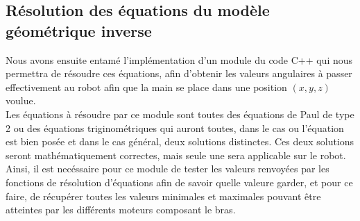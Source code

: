 \subsection{Résolution des équations du modèle géométrique inverse}

Nous avons ensuite entamé l'implémentation d'un module du code C++ qui nous permettra de résoudre ces équations, afin d'obtenir les valeurs angulaires à passer effectivement au robot afin que la main se place dans une position $(x, y, z)$ voulue.\\

Les équations à résoudre par ce module sont toutes des équations de Paul de type 2 ou des équations triginométriques qui auront toutes, dans le cas ou l'équation est bien posée et dans le cas général, deux solutions distinctes. Ces deux solutions seront mathématiquement correctes, mais seule une sera applicable sur le robot. Ainsi, il est necéssaire pour ce module de tester les valeurs renvoyées par les fonctions de résolution d'équations afin de savoir quelle valeure garder, et pour ce faire, de récupérer toutes les valeurs minimales et maximales pouvant être atteintes par les différents moteurs composant le bras.
